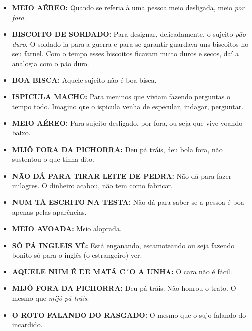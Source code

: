 \documentclass[12pt,brazil,]{book}
\providecommand{\tightlist}{%
  \setlength{\itemsep}{0pt}\setlength{\parskip}{0pt}}
\begin{document}
\begin{itemize}
\tightlist
\item
  \textbf{MEIO AÉREO:} Quando se referia à uma pessoa meio desligada,
  meio \emph{por fora}.\\
\item
  \textbf{BISCOITO DE SORDADO:} Para designar, delicadamente, o sujeito
  \emph{pão duro}. O soldado ia para a guerra e para se garantir
  guardava uns biscoitos no seu farnel. Com o tempo esses biscoitos
  ficavam muito duros e secos, daí a analogia com o pão duro.\\
\item
  \textbf{BOA BISCA:} Aquele sujeito não é boa bisca.\\
\item
  \textbf{ISPICULA MACHO:} Para meninos que viviam fazendo perguntas o
  tempo todo. Imagino que o ispicula venha de especular, indagar,
  perguntar.\\
\item
  \textbf{MEIO AÉREO:} Para sujeito desligado, por fora, ou seja que
  vive voando baixo.\\
\item
  \textbf{MIJÔ FORA DA PICHORRA:} Deu pá tráis, deu bola fora, não
  sustentou o que tinha dito.\\
\item
  \textbf{NÃO DÁ PARA TIRAR LEITE DE PEDRA:} Não dá para fazer milagres.
  O dinheiro acabou, não tem como fabricar.\\
\item
  \textbf{NUM TÁ ESCRITO NA TESTA:} Não dá para saber se a pessoa é boa
  apenas pelas aparências.\\
\item
  \textbf{MEIO AVOADA:} Meio aloprada.\\
\item
  \textbf{SÓ PÁ INGLEIS VÊ:} Está enganando, escamoteando ou seja
  fazendo bonito só para o inglês (o estrangeiro) ver.\\
\item
  \textbf{AQUELE NUM É DE MATÁ C´O A UNHA:} O cara não é fácil.\\
\item
  \textbf{MIJÔ FORA DA PICHORRA:} Deu pá tráis. Não honrou o trato. O
  mesmo que \emph{mijô pá tráis}.\\
\item
  \textbf{O ROTO FALANDO DO RASGADO:} O mesmo que o sujo falando do
  incardido.
\end{itemize}
\end{document}
